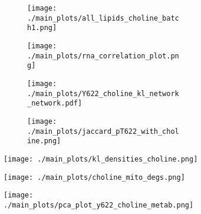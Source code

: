\begin{figure}[H]
    \begin{subfigure}[t]{.24\textwidth}
        \begin{subfigure}[t]{\textwidth}
            \caption{}
            \texttt{[image: ./main\_plots/all\_lipids\_choline\_batch1.png]}        
        \end{subfigure} 
        \begin{subfigure}[t]{\textwidth}
            \caption{}
            \vspace{-0.5cm}
            \centering
            \texttt{[image: ./main\_plots/rna\_correlation\_plot.png]}        
        \end{subfigure}  
    \end{subfigure}  
    \hspace{.5cm}
    \begin{subfigure}[t]{.23\textwidth}
        \begin{subfigure}[t]{\textwidth}
            \caption{}
            \texttt{[image: ./main\_plots/Y622\_choline\_kl\_network\_network.pdf]}        
        \end{subfigure}  
        \begin{subfigure}[t]{\textwidth}
            \caption{}
            \texttt{[image: ./main\_plots/jaccard\_pT622\_with\_choline.png]}        
        \end{subfigure} 
    \end{subfigure} 
    \hspace{.25cm}
    \begin{subfigure}[t]{.45\textwidth}
        \caption{}
        \texttt{[image: ./main\_plots/kl\_densities\_choline.png]}        
    \end{subfigure}  
    \vspace{.05cm}
    \begin{subfigure}[t]{.24\textwidth}
        \caption{}
        \texttt{[image: ./main\_plots/choline\_mito\_degs.png]}        
    \end{subfigure}  
    \hspace{.4cm} 
    \begin{subfigure}[t]{.17\textwidth}
        \caption{}
        \vspace{.3cm}
        \texttt{[image: ./main\_plots/pca\_plot\_y622\_choline\_metab.png]}        
    \end{subfigure} 

\end{figure}
